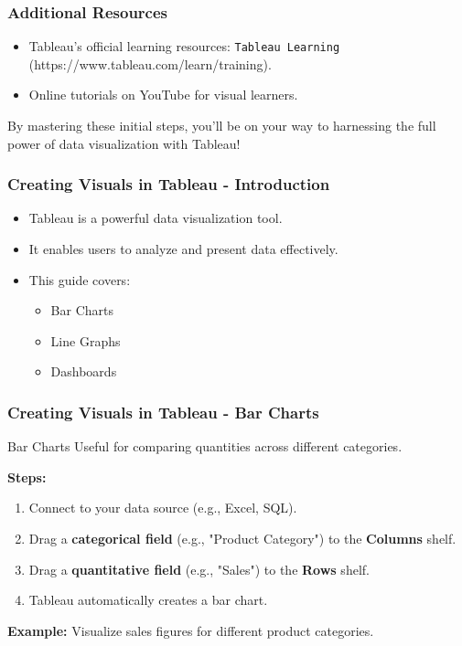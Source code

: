 \documentclass{beamer}
\begin{document}
\begin{frame}[fragile]
    \frametitle{Additional Resources}
    \begin{itemize}
        \item Tableau’s official learning resources: \texttt{Tableau Learning} (https://www.tableau.com/learn/training).
        \item Online tutorials on YouTube for visual learners.
    \end{itemize}
    
    By mastering these initial steps, you'll be on your way to harnessing the full power of data visualization with Tableau!
\end{frame}

\begin{frame}[fragile]
    \frametitle{Creating Visuals in Tableau - Introduction}
    \begin{itemize}
        \item Tableau is a powerful data visualization tool.
        \item It enables users to analyze and present data effectively.
        \item This guide covers:
        \begin{itemize}
            \item Bar Charts
            \item Line Graphs
            \item Dashboards
        \end{itemize}
    \end{itemize}
\end{frame}

\begin{frame}[fragile]
    \frametitle{Creating Visuals in Tableau - Bar Charts}
    \begin{block}{Bar Charts}
        Useful for comparing quantities across different categories.
    \end{block}
    \textbf{Steps:}
    \begin{enumerate}
        \item Connect to your data source (e.g., Excel, SQL).
        \item Drag a \textbf{categorical field} (e.g., "Product Category") to the \textbf{Columns} shelf.
        \item Drag a \textbf{quantitative field} (e.g., "Sales") to the \textbf{Rows} shelf.
        \item Tableau automatically creates a bar chart.
    \end{enumerate}
    \textbf{Example:} Visualize sales figures for different product categories.
\end{frame}
\end{document}
